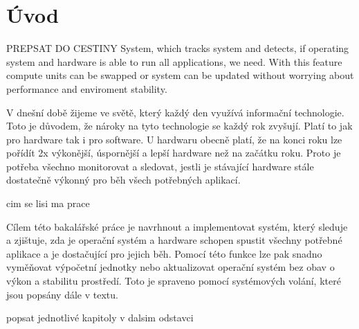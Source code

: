 \chapter{Úvod}

PREPSAT DO CESTINY
System, which tracks system and detects, if operating system and hardware is able to run all
applications, we need. With this feature compute units can be swapped or system can be updated
without worrying about performance and enviroment stability.

V dnešní době žijeme ve světě, který každý den využívá informační technologie. Toto je důvodem, že nároky na tyto technologie se
každý rok zvyšují. Platí to jak pro hardware tak i pro software. U hardwaru obecně platí, že na konci roku lze pořídít 2x výkonější,
úspornější a lepší hardware než na začátku roku. Proto je potřeba všechno monitorovat a sledovat, jestli je stávající hardware stále
dostatečně výkonný pro běh všech potřebných aplikací.

cim se lisi ma prace

Cílem této bakalářské práce je navrhnout a implementovat systém, který sleduje a zjištuje, zda je operační systém a hardware schopen
spustit všechny potřebné aplikace a je dostačující pro jejich běh. Pomocí této funkce lze pak snadno vyměňovat výpočetní jednotky nebo
aktualizovat operační systém bez obav o výkon a stabilitu prostředí. Toto je spraveno pomocí systémových volání, které jsou popsány dále
v textu.

popsat jednotlivé kapitoly v dalsim odstavci
